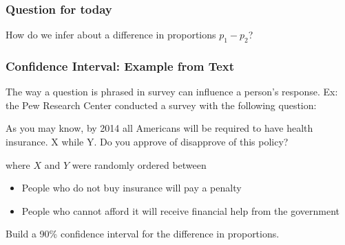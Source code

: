 \documentclass[handout]{beamer}
\newcommand{\blue}[1]{\textcolor{blue2}{#1}}
\begin{document}
\begin{frame}[fragile]
\frametitle{Question for today}

How do we infer about a difference in proportions $p_1-p_2$?

\end{frame}


\begin{frame}[fragile]
\frametitle{Confidence Interval: Example from Text}

The way a question is phrased in survey can influence a person's response.  Ex:  the Pew Research Center conducted a survey with the following question:

\pause\vspace{0.5cm}

As you may know, by 2014 all Americans will be required to have health insurance.  \blue{X while Y}.  Do you approve of disapprove of this policy?

\pause\vspace{0.5cm}

where $X$ and $Y$ were randomly ordered between
\begin{itemize}
\item People who do not buy insurance will pay a penalty
\item People who cannot afford it will receive financial help from the government
\end{itemize}

\vspace{0.5cm}

\pause Build a 90\% confidence interval for the difference in proportions.  

\end{frame}
\end{document}
